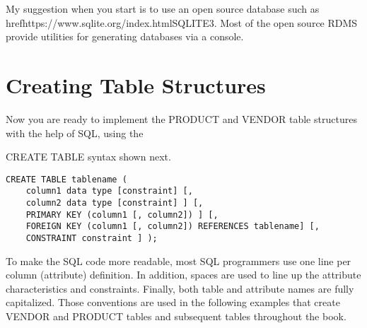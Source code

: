 My suggestion when you start is to use an open source database such as href{https://www.sqlite.org/index.html}{SQLITE3}. Most of the open source RDMS provide utilities for generating databases via a console. 


\section{Creating Table Structures}

Now you are ready to implement the PRODUCT and VENDOR table structures with the help of SQL, using the

CREATE TABLE syntax shown next.

\begin{verbatim}
CREATE TABLE tablename (
    column1 data type [constraint] [,
    column2 data type [constraint] ] [,
    PRIMARY KEY (column1 [, column2]) ] [,
    FOREIGN KEY (column1 [, column2]) REFERENCES tablename] [,
    CONSTRAINT constraint ] );
\end{verbatim}    


To make the SQL code more readable, most SQL programmers use one line per column (attribute) definition. In addition,
spaces are used to line up the attribute characteristics and constraints. Finally, both table and attribute names are
fully capitalized. Those conventions are used in the following examples that create VENDOR and PRODUCT tables
and subsequent tables throughout the book.

